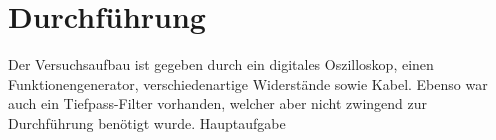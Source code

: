 \section{Durchführung}
\label{sec:Durchführung}
Der Versuchsaufbau ist gegeben durch ein digitales Oszilloskop, einen Funktionengenerator, verschiedenartige 
Widerstände sowie Kabel. Ebenso war auch ein Tiefpass-Filter vorhanden, welcher aber nicht zwingend zur
Durchführung benötigt wurde. Hauptaufgabe 